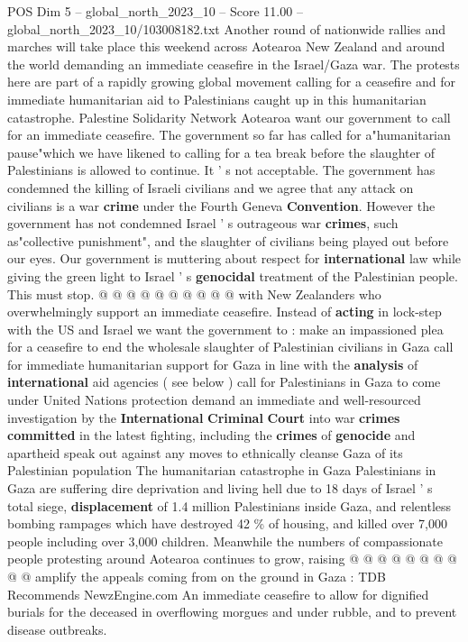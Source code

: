 \begin{textsample}{POS Dim 5 – global\_north\_2023\_10 – Score 11.00 – global\_north\_2023\_10/103008182.txt}  \label{ex:f5_pos_427}
Another round of nationwide rallies and marches will take place this weekend across Aotearoa New Zealand and around the world demanding an immediate ceasefire in the Israel/Gaza war.
The protests here are part of a rapidly growing global movement calling for a ceasefire and for immediate humanitarian aid to Palestinians caught up in this humanitarian catastrophe.
Palestine Solidarity Network Aotearoa want our government to call for an immediate ceasefire.
The government so far has called for a"humanitarian pause"which we have likened to calling for a tea break before the slaughter of Palestinians is allowed to continue.
It ' s not acceptable.
The government has condemned the killing of Israeli civilians and we agree that any attack on civilians is a war \textbf{crime} under the Fourth Geneva \textbf{Convention}.
However the government has not condemned Israel ' s outrageous war \textbf{crimes}, such as"collective punishment", and the slaughter of civilians being played out before our eyes.
Our government is muttering about respect for \textbf{international} law while giving the green light to Israel ' s \textbf{genocidal} treatment of the Palestinian people.
This must stop. @ @ @ @ @ @ @ @ @ @ with New Zealanders who overwhelmingly support an immediate ceasefire.
Instead of \textbf{acting} in lock-step with the US and Israel we want the government to : make an impassioned plea for a ceasefire to end the wholesale slaughter of Palestinian civilians in Gaza call for immediate humanitarian support for Gaza in line with the \textbf{analysis} of \textbf{international} aid agencies ( see below ) call for Palestinians in Gaza to come under United Nations protection demand an immediate and well-resourced investigation by the \textbf{International} \textbf{Criminal} \textbf{Court} into war \textbf{crimes} \textbf{committed} in the latest fighting, including the \textbf{crimes} of \textbf{genocide} and apartheid speak out against any moves to ethnically cleanse Gaza of its Palestinian population The humanitarian catastrophe in Gaza Palestinians in Gaza are suffering dire deprivation and living hell due to 18 days of Israel ' s total siege, \textbf{displacement} of 1.4 million Palestinians inside Gaza, and relentless bombing rampages which have destroyed 42 \% of housing, and killed over 7,000 people including over 3,000 children.
Meanwhile the numbers of compassionate people protesting around Aotearoa continues to grow, raising @ @ @ @ @ @ @ @ @ @ amplify the appeals coming from on the ground in Gaza : TDB Recommends NewzEngine.com An immediate ceasefire to allow for dignified burials for the deceased in overflowing morgues and under rubble, and to prevent disease outbreaks.

\end{textsample}

